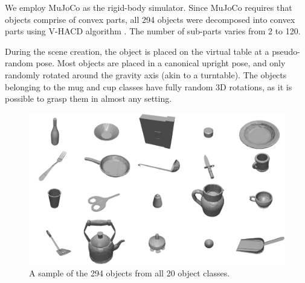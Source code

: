 We employ MuJoCo \cite{MuJoCo} as the rigid-body simulator. Since MuJoCo requires that objects comprise of convex parts, all 294 objects were decomposed into convex parts using V-HACD algorithm \cite{V-HACD}. The number of sub-parts varies from 2 to 120.

During the scene creation, the object is placed on the virtual table at a pseudo-random pose. Most objects are placed in a canonical upright pose, and only randomly rotated around the gravity axis (akin to a turntable). The objects belonging to the mug and cup classes have fully random 3D rotations, as it is possible to grasp them in almost any setting.

\begin{figure}
  \includegraphics[width=\linewidth]{images/allObjects-small.pdf}
  \caption{A sample of the 294 objects from all 20 object classes.
  \label{fig:allObjects}}
\end{figure}

